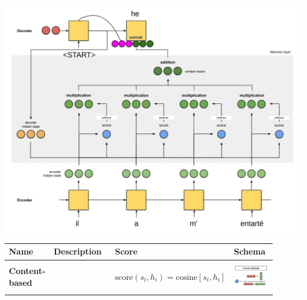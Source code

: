 \documentclass[11pt]{article}
\begin{document}
\begin{center}
	\includegraphics[width=0.6\linewidth]{img/seq2seq_attention}
\end{center}

\begin{tabularx}{\linewidth}{m{0.1\linewidth} m{0.3\linewidth} m{0.3\linewidth} m{0.2\linewidth} }
	\textbf{Name} & \textbf{Description} & \textbf{Score} & \textbf{Schema}\\
	\hline
	& & & \\[-1em]
	\textbf{Content-based} & \parencite{graves2014neural} & $\text{score}(s_t,h_i) = \text{cosine}\left[s_t,h_i\right] $ & \includegraphics[width=\linewidth]{img/attention_cosine}\\
	& & & \\[-0.5em]

\end{tabularx}
\end{document}
